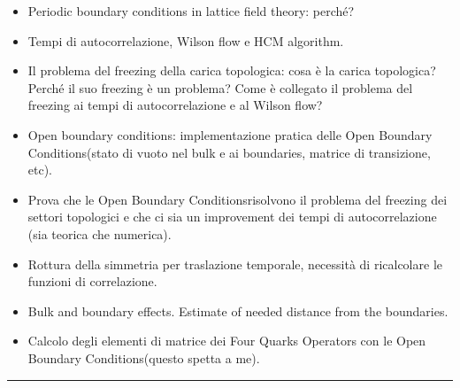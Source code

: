 \documentclass[12pt,a4paper,openright]{article}
\newcommand{\colr}{\textcolor{BrickRed}}
\newcommand{\obc}{Open Boundary Conditions}
\begin{document}
\begin{itemize}
  \item Periodic boundary conditions in lattice field theory: perché?
  \item Tempi di autocorrelazione, Wilson flow e HCM algorithm.
  \item Il problema del freezing della carica topologica: cosa è la carica topologica? Perché il suo freezing è un problema? Come è collegato il problema del freezing ai tempi di autocorrelazione e al Wilson flow?
  \item Open boundary conditions: implementazione pratica delle \obc (stato di vuoto nel bulk e ai boundaries, matrice di transizione, etc).
  \item Prova che le \obc risolvono il problema del freezing dei settori topologici e che ci sia un improvement dei tempi di autocorrelazione (sia teorica che numerica).
  \item Rottura della simmetria per traslazione temporale, necessità di ricalcolare le funzioni di correlazione.
  \item Bulk and boundary effects. Estimate of needed distance from the boundaries.
  \item Calcolo degli elementi di matrice dei Four Quarks Operators con le \obc (\colr{questo spetta a me}).
\end{itemize}
\hrule
\end{document}
